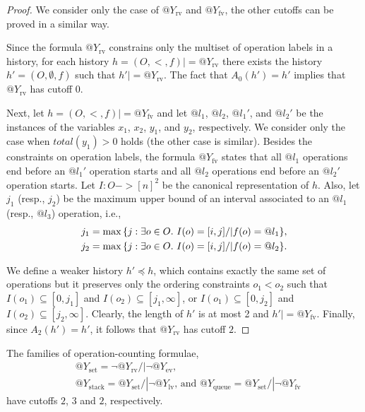 \begin{proof}

  We consider only the case of $@Y_\mathrm{rv}$ and $@Y_\mathrm{fv}$, the other
  cutoffs can be proved in a similar way.
 
  Since the formula $@Y_\mathrm{rv}$ constrains only the multiset of operation
  labels in a history, for each history $h=(O,<,f) |= @Y_\mathrm{rv}$ there
  exists the history $h'=(O,\emptyset,f)$ such that $h' |= @Y_\mathrm{rv}$. The
  fact that $A_0(h')=h'$ implies that $@Y_\mathrm{rv}$ has cutoff $0$.
 
  Next, let $h=(O,<,f) |= @Y_\mathrm{fv}$ and let $@l_1$, $@l_2$, $@l_1'$, and
  $@l_2'$ be the instances of the variables $x_1$, $x_2$, $y_1$, and $y_2$,
  respectively. We consider only the case when $total(y_1)>0$ holds (the other
  case is similar). Besides the constraints on operation labels, the formula
  $@Y_\mathrm{fv}$ states that all $@l_1$ operations end before an $@l_1'$
  operation starts and all $@l_2$ operations end before an $@l_2'$ operation
  starts. Let $I:O->[n]^2$ be the canonical representation of $h$. Also, let
  $j_1$ (resp., $j_2$) be the maximum upper bound of an interval associated to
  an $@l_1$ (resp., $@l_3$) operation, i.e.,
  \begin{align*}
    j_1 = \max{\{ j:\exists o\in O.\ I(o) = [i,j] /| f(o)=@l_1 \}},\\
    j_2 = \max{\{ j:\exists o\in O.\ I(o) = [i,j] /| f(o)=@l_2 \}}.
  \end{align*}
 
  We define a weaker history $h'\preceq h$, which contains exactly the same set
  of operations but it preserves only the ordering constraints $o_1<o_2$ such
  that $I(o_1)\subseteq [0,j_1]$ and $I(o_2)\subseteq [j_1,\infty]$, or
  $I(o_1)\subseteq [0,j_2]$ and $I(o_2)\subseteq [j_2,\infty]$. Clearly, the
  length of $h'$ is at most 2
  and $h'|= @Y_\mathrm{fv}$. Finally, since $A_2(h')=h'$, it follows that
  $@Y_\mathrm{rv}$ has cutoff $2$.
\end{proof}

\begin{corollary}

  The families of operation-counting formulae,
  \begin{align*}
    & @Y_\mathrm{set}   = \lnot @Y_\mathrm{rv} /| \lnot @Y_\mathrm{ev}
    \text{, } \\
    & @Y_\mathrm{stack} = @Y_\mathrm{set} /| \lnot @Y_\mathrm{lv}
    \text{, and }
    @Y_\mathrm{queue} = @Y_\mathrm{set} /| \lnot @Y_\mathrm{fv}
  \end{align*}
  have cutoffs $2$, $3$ and $2$, respectively.

\end{corollary}


